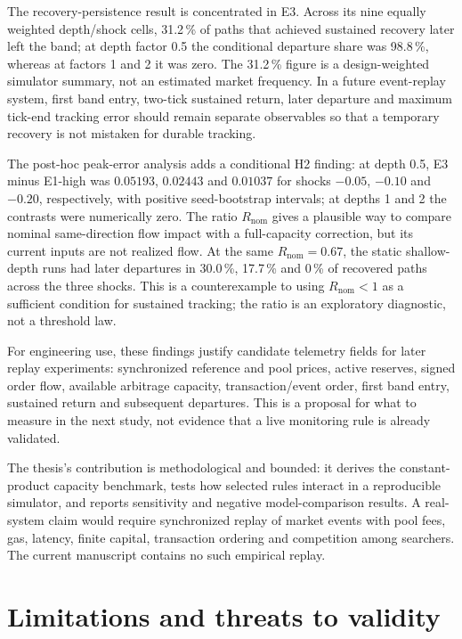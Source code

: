 The recovery-persistence result is concentrated in E3. Across its nine equally weighted depth/shock cells, 31.2\,\% of paths that achieved sustained recovery later left the band; at depth factor 0.5 the conditional departure share was 98.8\,\%, whereas at factors 1 and 2 it was zero. The 31.2\,\% figure is a design-weighted simulator summary, not an estimated market frequency. In a future event-replay system, first band entry, two-tick sustained return, later departure and maximum tick-end tracking error should remain separate observables so that a temporary recovery is not mistaken for durable tracking.

The post-hoc peak-error analysis adds a conditional H2 finding: at depth 0.5, E3 minus E1-high was $0.05193$, $0.02443$ and $0.01037$ for shocks $-0.05$, $-0.10$ and $-0.20$, respectively, with positive seed-bootstrap intervals; at depths 1 and 2 the contrasts were numerically zero. The ratio $R_{\mathrm{nom}}$ gives a plausible way to compare nominal same-direction flow impact with a full-capacity correction, but its current inputs are not realized flow. At the same $R_{\mathrm{nom}}=0.67$, the static shallow-depth runs had later departures in 30.0\,\%, 17.7\,\% and 0\,\% of recovered paths across the three shocks. This is a counterexample to using $R_{\mathrm{nom}}<1$ as a sufficient condition for sustained tracking; the ratio is an exploratory diagnostic, not a threshold law.

For engineering use, these findings justify candidate telemetry fields for later replay experiments: synchronized reference and pool prices, active reserves, signed order flow, available arbitrage capacity, transaction/event order, first band entry, sustained return and subsequent departures. This is a proposal for what to measure in the next study, not evidence that a live monitoring rule is already validated.

The thesis's contribution is methodological and bounded: it derives the constant-product capacity benchmark, tests how selected rules interact in a reproducible simulator, and reports sensitivity and negative model-comparison results. A real-system claim would require synchronized replay of market events with pool fees, gas, latency, finite capital, transaction ordering and competition among searchers. The current manuscript contains no such empirical replay.

\section{Limitations and threats to validity}


